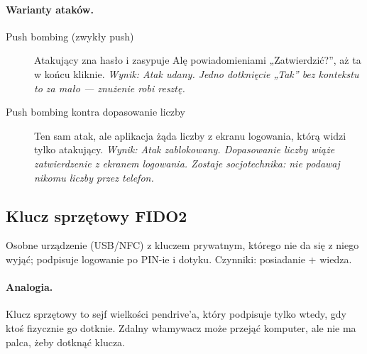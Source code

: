 \paragraph{Warianty ataków.}
\begin{description}
\item[Push bombing (zwykły push)] Atakujący zna hasło i zasypuje Alę powiadomieniami „Zatwierdzić?”, aż ta w końcu kliknie. \emph{Wynik: Atak udany. Jedno dotknięcie „Tak” bez kontekstu to za mało — znużenie robi resztę.}
\item[Push bombing kontra dopasowanie liczby] Ten sam atak, ale aplikacja żąda liczby z ekranu logowania, którą widzi tylko atakujący. \emph{Wynik: Atak zablokowany. Dopasowanie liczby wiąże zatwierdzenie z ekranem logowania. Zostaje socjotechnika: nie podawaj nikomu liczby przez telefon.}
\end{description}

\subsection{Klucz sprzętowy FIDO2}
\label{sec:mech-fido2}
Osobne urządzenie (USB/NFC) z kluczem prywatnym, którego nie da się z niego wyjąć; podpisuje logowanie po PIN-ie i dotyku. Czynniki: posiadanie + wiedza. \cite{S1,S2,P1,P2,P3,P6,N1,A1}

\paragraph{Analogia.} Klucz sprzętowy to sejf wielkości pendrive’a, który podpisuje tylko wtedy, gdy ktoś fizycznie go dotknie. Zdalny włamywacz może przejąć komputer, ale nie ma palca, żeby dotknąć klucza.

